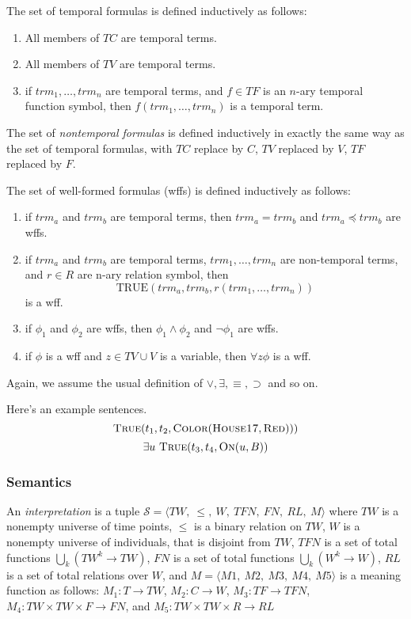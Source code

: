 The set of temporal formulas is defined inductively as follows:
\begin{enumerate}
	\item All members of $TC$ are temporal terms.
	\item All members of $TV$ are temporal terms.
	\item if $trm_1, \dots, trm_n$ are temporal terms, and $f \in TF$ is an $n$-ary temporal function symbol, then $f(trm_1, \dots, trm_n)$ is a temporal term.
\end{enumerate}

The set of \textit{nontemporal formulas} is defined inductively in exactly the same way as the set of temporal formulas, with
$TC$ replace by $C$, $TV$ replaced by $V$, $TF$ replaced by $F$.

The set of well-formed formulas (wffs) is defined inductively as follows:
\begin{enumerate}
	\item if $trm_a$ and $trm_b$ are temporal terms, then $trm_a = trm_b$ and $trm_a \preceq trm_b$ are wffs.
	\item if $trm_a$ and $trm_b$ are temporal terms, $trm_1, \dots, trm_n$ are non-temporal terms, and $r \in R$ are n-ary relation symbol,
	      then
	      \[
		      \text{TRUE}(trm_a, trm_b, r(trm_1, \dots, trm_n))
	      \]
	      is a wff.
	\item if $\phi_1$ and $\phi_2$ are wffs, then $\phi_1 \land \phi_2$ and $\neg \phi_1$ are wffs.
	\item if $\phi$ is a wff and $z \in TV \cup V$ is a variable, then $\forall z \phi$ is a wff.
\end{enumerate}

Again, we assume the usual definition of $\lor, \exists, \equiv, \supset$ and so on.

\begin{exmp} Here's an example sentences.
	\begin{equation}
		\textsc{True}(t_1, t_2, \textsc{Color}(\textsc{House17}, \textsc{Red})))
	\end{equation}
	\begin{equation}
		\exists u \ \textsc{True}(t_3, t_4, \textsc{On}(u,B))
	\end{equation}
\end{exmp}

\subsubsection{Semantics}
An \textit{interpretation} is a tuple $\mathscr{S} = \langle  TW,\ \leqslant,\ W,\ TFN,\ FN,\ RL,\ M\rangle$ where $TW$
is a nonempty universe of time points, $\leqslant$ is a binary relation on $TW$, $W$ is a nonempty universe of individuals,
that is disjoint from $TW$, $TFN$ is a set of total functions $\bigcup_k (TW^k \rightarrow TW)$,
$FN$ is a set of total functions $ \bigcup_k (W^k \rightarrow W)$, $RL$ is a set of total relations over $W$, and
$M = \langle M1,\ M2,\ M3,\ M4,\ M5 \rangle$ is a meaning function as follows: $M_1 : T \rightarrow TW$,
$M_2: C \to W$, $M_3 : TF \to TFN$, $M_4 : TW \times TW \times F \to FN$, and $M_5: TW \times TW \times R \to RL$

